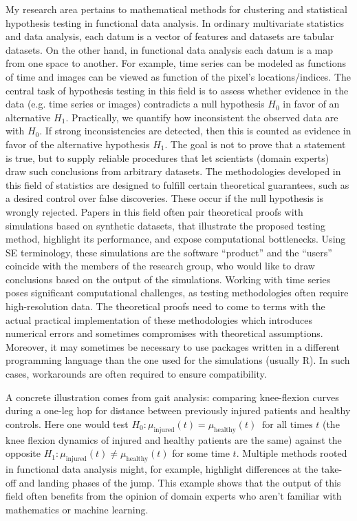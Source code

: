 My research area pertains to mathematical methods for clustering and statistical hypothesis testing in functional data analysis. In ordinary multivariate statistics and data analysis, each datum is a vector of features and datasets are tabular datasets. On the other hand, in functional data analysis each datum is a map from one space to another. For example, time series can be modeled as functions of time and images can be viewed as function of the pixel's locations/indices. The central task of hypothesis testing in this field is to assess whether evidence in the data (e.g. time series or images) contradicts a null hypothesis $H_0$ in favor of an alternative $H_1$. Practically, we quantify how inconsistent the observed data are with $H_0$. If strong inconsistencies are detected, then this is counted as evidence in favor of the alternative hypothesis $H_1$. The goal is not to prove that a statement is true, but to supply reliable procedures that let scientists (domain experts) draw such conclusions from arbitrary datasets. The methodologies developed in this field of statistics are designed to fulfill certain theoretical guarantees, such as a desired control over false discoveries. These occur if the null hypothesis is wrongly rejected. 
Papers in this field often pair theoretical proofs with simulations based on synthetic datasets, that illustrate the proposed testing method, highlight its performance, and expose computational bottlenecks. Using SE terminology, these simulations are the software “product” and the “users” coincide with the members of the research group, who would like to draw conclusions based on the output of the simulations. Working with time series poses significant computational challenges, as testing methodologies often require high-resolution data. The theoretical proofs need to come to terms with the actual practical implementation of these methodologies which introduces numerical errors and sometimes compromises with theoretical assumptions. Moreover, it may sometimes be necessary to use packages written in a different programming language than the one used for the simulations (usually R). In such cases, workarounds are often required to ensure compatibility.

A concrete illustration comes from gait analysis: comparing knee-flexion curves during a one-leg hop for distance between previously injured patients and healthy controls. Here one would test \(H_0: \mu_{\text{injured}}(t) = \mu_{\text{healthy}}(t)\ \text{ for all times } t\) (the knee flexion dynamics of injured and healthy patients are the same) against the opposite \(H_1: \mu_{\text{injured}}(t) \neq \mu_{\text{healthy}}(t)\) for some time \(t\). Multiple methods rooted in functional data analysis might, for example, highlight differences at the take-off and landing phases of the jump. This example shows that the output of this field often benefits from the opinion of domain experts who aren’t familiar with mathematics or machine learning.

